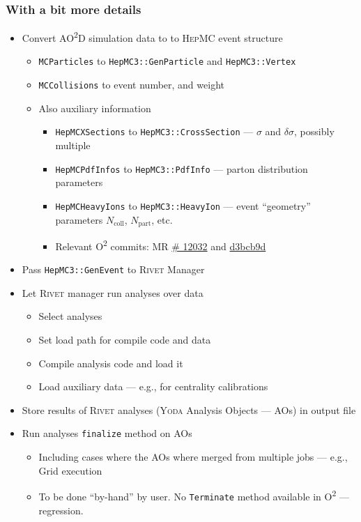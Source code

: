\documentclass[compress,table,8pt]{beamer}
\newcommand\Rivet{{\scshape Rivet}}
\newcommand\Yoda{{\scshape Yoda}}
\newcommand\HepMC{{\scshape HepMC}}
\newcommand\Otwo{O\textsuperscript{2}}
\newcommand\AOD{AO\textsuperscript{2}D}
\begin{document}
\begin{frame}
  \frametitle{With a bit more details}
  \begin{itemize}
  \item<+-> Convert \AOD{} simulation data to to \HepMC{} event structure
    \begin{itemize}
    \item \texttt{MCParticles} to \texttt{HepMC3::GenParticle} and
      \texttt{HepMC3::Vertex}
    \item \texttt{MCCollisions} to event number, and weight
    \item Also auxiliary information
      \begin{itemize}
      \item \texttt{HepMCXSections} to \texttt{HepMC3::CrossSection}
        --- $\sigma$ and $\delta\sigma$, possibly multiple
      \item \texttt{HepMCPdfInfos} to \texttt{HepMC3::PdfInfo} ---
        parton distribution parameters
      \item \texttt{HepMCHeavyIons} to \texttt{HepMC3::HeavyIon} ---
        event ``geometry'' parameters $N_{\mathrm{coll}}$,
        $N_{\mathrm{part}}$, etc.
      \item Relevant \Otwo{} commits: MR
        \href{https://github.com/AliceO2Group/AliceO2/pull/12032/commits}{\#
          12032} and
        \href{https://github.com/AliceO2Group/AliceO2/commit/d3bcb9d5c98a14618e100c4d476103b8f5989ae1}{d3bcb9d}
      \end{itemize}
    \end{itemize}
  \item<+-> Pass \texttt{HepMC3::GenEvent} to \Rivet{} Manager
  \item<+-> Let \Rivet{} manager run analyses over data
    \begin{itemize}
    \item Select analyses
    \item Set load path for compile code and data
    \item Compile analysis code and load it
    \item Load auxiliary data --- e.g., for centrality calibrations
    \end{itemize}
  \item<+-> Store results of \Rivet{} analyses (\Yoda{} Analysis Objects
    --- AOs) in output file
  \item<+-> Run analyses \texttt{finalize} method on AOs
    \begin{itemize}
    \item Including cases where the AOs where merged from multiple
      jobs --- e.g., Grid execution
    \item To be done ``by-hand'' by user. \newline
      {\footnotesize \alert{No \texttt{Terminate} method available in
          \Otwo{}} --- regression. }
    \end{itemize}
  \end{itemize}
\end{frame}
\end{document}
